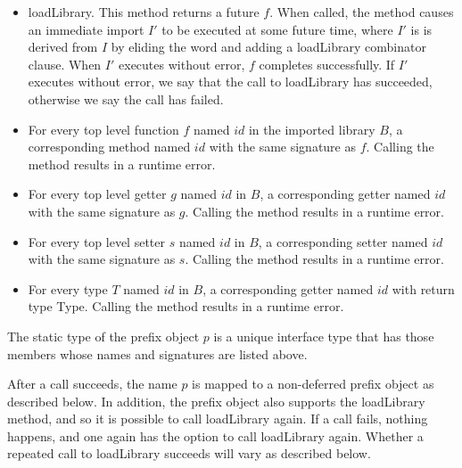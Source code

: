 \documentclass{article}
\newcommand{\code}[1]{{\sf #1}}
\begin{document}
\begin{itemize}
\item \code{loadLibrary}. This method returns a future $f$. When called, the method causes an immediate import $I'$ to be executed at some future time, where $I'$ is is derived from $I$ by eliding the word \DEFERRED{} and adding a \HIDE{} \code{loadLibrary}  combinator clause. When $I'$ executes without error, $f$ completes successfully. If $I'$ executes without error, we say that the call to \code{loadLibrary} has succeeded, otherwise we say the call has failed.
\item  For every top level function $f$ named $id$ in the imported library $B$, a corresponding method named $id$ with the same signature as $f$. Calling the method results in a runtime error.
\item For every top level getter $g$ named $id$ in $B$, a corresponding getter named $id$ with the same signature as $g$.  Calling the method results in a runtime error.
\item For every top level setter $s$ named $id$ in $B$, a corresponding setter named $id$ with the same signature as $s$.  Calling the method results in a runtime error.
\item For every type $T$ named $id$ in $B$, a corresponding getter named $id$ with return type \code{Type}.  Calling the method results in a runtime error.
\end{itemize}


The static type of the prefix object $p$ is a unique interface type that has those members whose names and signatures are listed above.

\LMHash{}
After a call succeeds, the name $p$ is mapped to a non-deferred prefix object as described below. In addition, the prefix object also supports the \code{loadLibrary} method, and so it is possible to call \code{loadLibrary} again. If a call fails, nothing happens, and one again has the option to call \code{loadLibrary} again. Whether a repeated call to \code{loadLibrary} succeeds will vary as described below.
\end{document}
